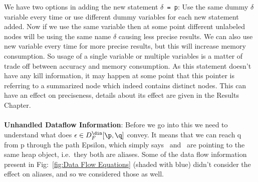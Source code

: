 We have two options in adding the new statement {\tt $\delta$ = p}: Use the same dummy $\delta$ variable every time or
 use different dummy variables for each new statement added. Now if we use the same variable then at some point different unlabeled nodes will be 
 using the same name $\delta$ causing less precise results. We can also use new variable every time for more precise results, but 
 this will increase memory consumption. So usage of a single variable or multiple variables is a matter of trade off between 
 accuracy and memory consumption. As this statement doesn't have any kill information, it may happen at some point that this pointer is referring to a
summarized node which indeed contains distinct nodes. This can have an effect on preciseness, details about its effect are given in the Results Chapter.\\ \\
\textbf{Unhandled Dataflow Information}:
Before we go into this we need to understand what does  $\epsilon \in D_F^{\din}[\p,\q]$ convey. It means that we can reach q from p through
the path Epsilon, which simply says \p\ and \q\ are pointing to the same heap object, i.e.\ they both are aliases. Some of the data flow information
present in Fig:~\ref{fig:Data Flow Equations} (shaded with blue) didn't consider the effect on aliases, and so we considered those as well.

